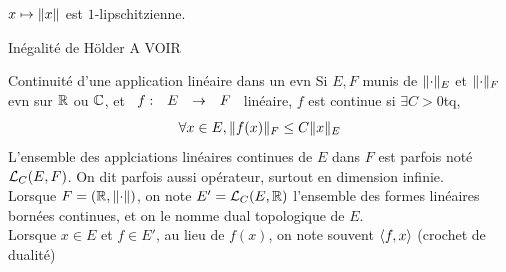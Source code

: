 \documentclass[]{report}
\begin{document}
\begin{prop}{}{}
    $x\mapsto \lVert x \rVert$ est $1$-lipschitzienne.
\end{prop}

\begin{prop}{Inégalité de Hölder}{}
    A VOIR
\end{prop}

\begin{prop}{Continuité d'une application linéaire dans un evn}{}
    Si $E,F$ munis de $\lVert \cdot \rVert_E$ et $\lVert \cdot \rVert_F$ evn sur $\mathbb{R}$ ou $\mathbb{C}$, et $\begin{array}{ccccc} f : & E & \to & F \end{array}$ linéaire, $f$ est continue si $\exists C>0$tq,
    \[\forall x\in E,\lVert f(x) \rVert_{F}\le C\lVert x \rVert_E\]
    L'ensemble des applciations linéaires continues de $E$ dans $F$ est parfois noté $\mathcal{L}_{C}(E,F)$. On dit parfois aussi opérateur, surtout en dimension infinie.\\
    Lorsque $F=(\mathbb{R},\lVert \cdot \rVert)$, on note $E'=\mathcal{L}_C(E,\mathbb{R})$ l'ensemble des formes linéaires bornées continues, et on le nomme dual topologique de $E$.\\
    Lorsque $x\in E$ et $f\in E'$, au lieu de $f(x)$, on note souvent $\langle f,x \rangle$ (crochet de dualité)
\end{prop}
\end{document}

